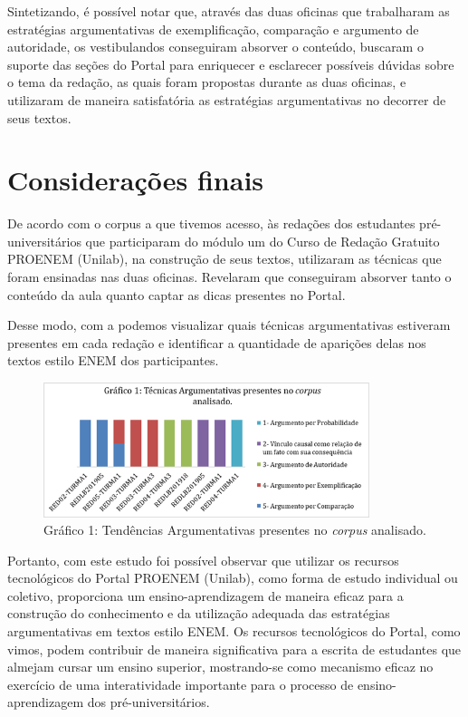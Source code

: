 \documentclass{textolivre}
\begin{document}
Sintetizando, é possível notar que, através das duas oficinas que trabalharam as estratégias argumentativas de exemplificação, comparação e argumento de autoridade, os vestibulandos conseguiram absorver o conteúdo, buscaram o suporte das seções do Portal para enriquecer e esclarecer possíveis dúvidas sobre o tema da redação, as quais foram propostas durante as duas oficinas, e utilizaram de maneira satisfatória as estratégias argumentativas no decorrer de seus textos.

\section{Considerações finais}
De acordo com o corpus a que tivemos acesso, às redações dos estudantes pré-universitários que participaram do módulo um do Curso de Redação Gratuito PROENEM (Unilab), na construção de seus textos, utilizaram as técnicas que foram ensinadas nas duas oficinas. Revelaram que conseguiram absorver tanto o conteúdo da aula quanto captar as dicas presentes no Portal. 

Desse modo, com a  podemos visualizar quais técnicas argumentativas estiveram presentes em cada redação e identificar a quantidade de aparições delas nos textos estilo ENEM dos participantes.

\begin{figure}[htbp]
 \centering
 \includegraphics[width=0.85\textwidth]{fig2-33162.png}
 \caption{Gráfico 1: Tendências Argumentativas presentes no \emph{corpus} analisado.}
 \label{fig2}
\end{figure}

Portanto, com este estudo foi possível observar que utilizar os recursos tecnológicos do Portal PROENEM (Unilab), como forma de estudo individual ou coletivo, proporciona um ensino-aprendizagem de maneira eficaz para a construção do conhecimento e da utilização adequada das estratégias argumentativas em textos estilo ENEM. Os recursos tecnológicos do Portal, como vimos, podem contribuir de maneira significativa para a escrita de estudantes que almejam cursar um ensino superior, mostrando-se como mecanismo eficaz no exercício de uma interatividade importante para o processo de ensino-aprendizagem dos pré-universitários.
\end{document}
